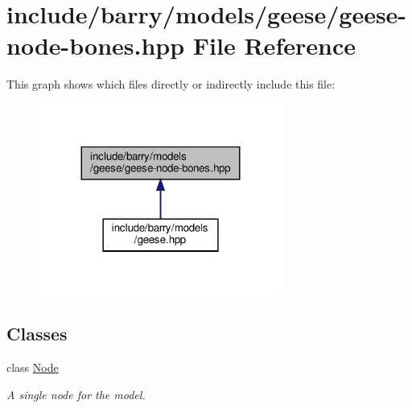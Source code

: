 \hypertarget{geese-node-bones_8hpp}{}\section{include/barry/models/geese/geese-\/node-\/bones.hpp File Reference}
\label{geese-node-bones_8hpp}
This graph shows which files directly or indirectly include this file\+:
\nopagebreak
\begin{figure}[H]
\begin{center}
\leavevmode
\includegraphics[width=227pt]{geese-node-bones_8hpp__dep__incl}
\end{center}
\end{figure}
\subsection*{Classes}
\begin{DoxyCompactItemize}
\item 
class \hyperlink{class_node}{Node}
\begin{DoxyCompactList}\small\item\em A single node for the model. \end{DoxyCompactList}\end{DoxyCompactItemize}
